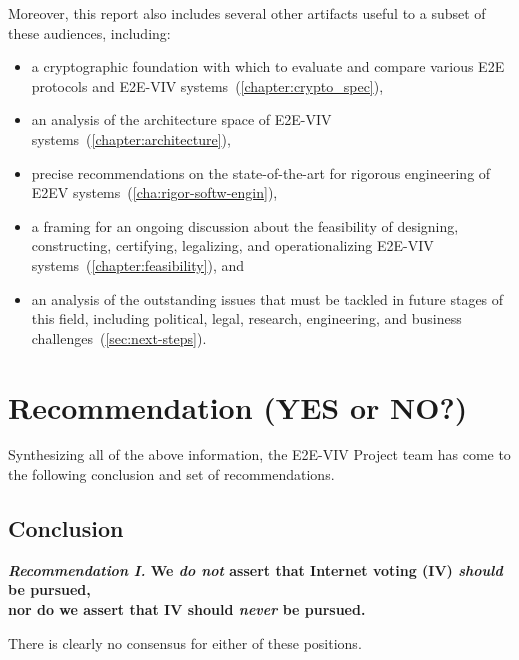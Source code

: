 Moreover, this report also includes several other artifacts useful to
a subset of these audiences, including:
\begin{itemize}
\item a cryptographic foundation with which to evaluate and compare
  various E2E protocols and E2E-VIV
  systems~(\autoref{chapter:crypto_spec}),
\item an analysis of the architecture space of E2E-VIV
  systems~(\autoref{chapter:architecture}),
\item precise recommendations on the state-of-the-art for rigorous
  engineering of E2EV systems~(\autoref{cha:rigor-softw-engin}),
\item a framing for an ongoing discussion about the feasibility of
  designing, constructing, certifying, legalizing, and operationalizing
  E2E-VIV systems~(\autoref{chapter:feasibility}), and
\item an analysis of the outstanding issues that must be tackled in
  future stages of this field, including political, legal, research,
  engineering, and business challenges~(\autoref{sec:next-steps}).
\end{itemize}

\section{Recommendation (YES or NO?)}

Synthesizing all of the above information, the E2E-VIV Project team has
come to the following conclusion and set of
recommendations. 

\subsection{Conclusion}
\label{sec:conclusion}

\begin{center}
  \textbf{\emph{Recommendation I.} We \emph{do not} assert that
    Internet voting (IV) \emph{should} be pursued,\\
    nor do we assert that IV should \emph{never} be pursued.}
\end{center}

There is clearly no consensus for either of these positions.

